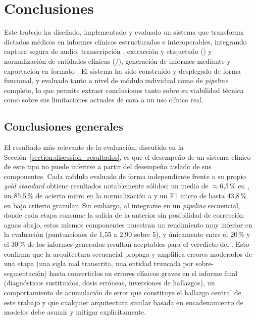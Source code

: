 \chapter{Conclusiones}\label{chapter:conclusiones}

Este trabajo ha diseñado, implementado y evaluado un sistema  que transforma
dictados médicos en informes clínicos estructurados e interoperables, integrando captura segura de
audio, transcripción , extracción y etiquetado () y normalización de entidades clínicas
(/), generación de informes mediante 
y exportación en formato . El sistema ha sido construido y desplegado de forma
funcional, y evaluado tanto a nivel de módulo individual como de \textit{pipeline} completo, lo que
permite extraer conclusiones tanto sobre su viabilidad técnica como sobre sus limitaciones actuales
de cara a un uso clínico real.

\section{Conclusiones generales}\label{section:conclusiones_generales}

El resultado más relevante de la evaluación, discutido en la
Sección~\ref{section:discusion_resultados}, es que el desempeño de un sistema clínico de este tipo no
puede inferirse a partir del desempeño aislado de sus componentes. Cada módulo evaluado de forma
independiente frente a su propio \textit{gold standard} obtiene resultados notablemente sólidos: un
 medio de $\approx$6,5\,\% en , un 85,5\,\% de acierto micro en la
normalización a  y un F1 micro de hasta 43,8\,\% en  bajo
criterio granular. Sin embargo, al integrarse en un \textit{pipeline} secuencial, donde cada etapa
consume la salida de la anterior sin posibilidad de corrección aguas abajo, estos mismos componentes
muestran un rendimiento muy inferior en la evaluación  (puntuaciones de
1,55 a 2,90 sobre 5), y únicamente entre el 20\,\% y el 30\,\% de los informes generados resultan
aceptables para el veredicto del . Esto confirma que la arquitectura
secuencial propaga y amplifica errores moderados de una etapa (una sigla mal transcrita, una entidad
truncada por sobre-segmentación) hasta convertirlos en errores clínicos graves en el informe final
(diagnósticos sustituidos, dosis erróneas, inversiones de hallazgos), un comportamiento de
acumulación de error que constituye el hallazgo central de este trabajo y que cualquier
arquitectura similar basada en encadenamiento de modelos debe asumir y mitigar explícitamente.

